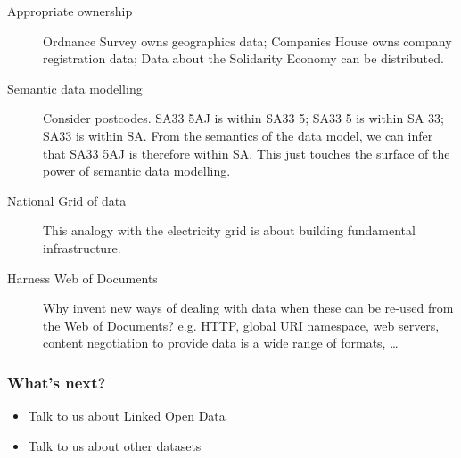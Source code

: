 \begin{description}
  \item[Appropriate ownership] Ordnance Survey owns geographics data; Companies House owns company registration data; Data about the Solidarity Economy can be distributed.
  \item[Semantic data modelling] \geek Consider postcodes. SA33 5AJ is within SA33 5; SA33 5 is within SA 33; SA33 is within SA. From the semantics of the data model, we can infer that SA33 5AJ is therefore within SA. This just touches the surface of the power of semantic data modelling.
  \item[National Grid of data] This analogy with the electricity grid is about building fundamental infrastructure.
  \item[Harness Web of Documents] \geek Why invent new ways of dealing with data when these can be re-used from the Web of Documents? e.g. HTTP, global URI namespace, web servers, content negotiation to provide data is a wide range of formats, \dots
\end{description}
\frame
{
  \frametitle{What's next?}
  \begin{itemize}
    \item Talk to us about Linked Open Data
    \item Talk to us about other datasets
  \end{itemize}
}



